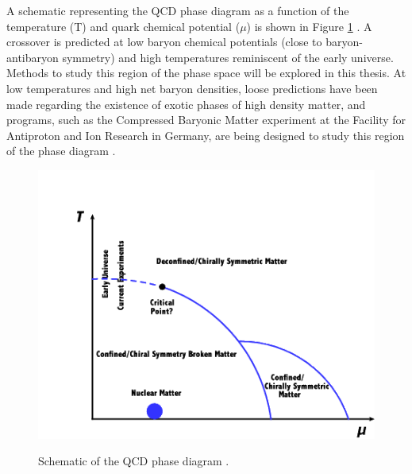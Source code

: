 A schematic representing the QCD phase diagram as a function of the temperature (T) and quark chemical potential ($\mu$) is shown in Figure \ref{fig:PhaseDiagram} \cite{1742-6596-761-1-012066}. A crossover is predicted at low baryon chemical potentials (close to baryon-antibaryon symmetry) and high temperatures reminiscent of the early universe. Methods to study this region of the phase space will be explored in this thesis. At low temperatures and high net baryon densities, loose predictions have been made regarding the existence of exotic phases of high density matter, and programs, such as the Compressed Baryonic Matter experiment at the Facility for Antiproton and Ion Research in Germany, are being designed to study this region of the phase diagram \cite{HEUSER2013941c}.
\begin{figure}[h]
  \centering
  \includegraphics[width=5.5in]{figures/1742-6596-761-1-012066.png}\\
  \caption{Schematic of the QCD phase diagram \cite{1742-6596-761-1-012066}.}\label{fig:PhaseDiagram}
\end{figure}


